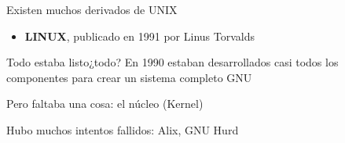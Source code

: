 \documentclass{beamer}
\begin{document}
\begin{frame}{Existen muchos derivados de UNIX}
\begin{itemize}
 \item\textbf{LINUX}, publicado en 1991 por Linus Torvalds 
 \end{itemize}
\end{frame}

\begin{frame}{Todo estaba listo}{¿todo?}
En 1990 estaban desarrollados casi todos los componentes para crear un sistema completo GNU

Pero faltaba una cosa: el núcleo (Kernel)

Hubo muchos intentos fallidos: Alix, GNU Hurd

\end{frame}
\end{document}
